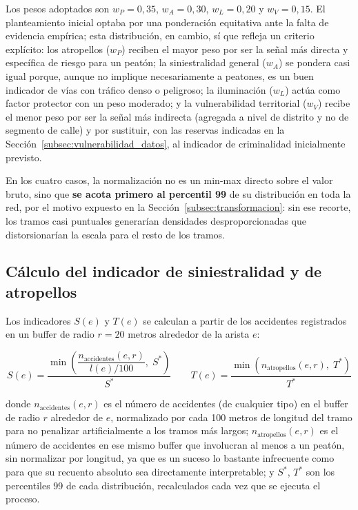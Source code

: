 Los pesos adoptados son $w_P = 0{,}35$, $w_A = 0{,}30$, $w_L = 0{,}20$ y $w_V = 0{,}15$. El planteamiento inicial optaba por una ponderación equitativa ante la falta de evidencia empírica; esta distribución, en cambio, sí que refleja un criterio explícito: los atropellos ($w_P$) reciben el mayor peso por ser la señal más directa y específica de riesgo para un peatón; la siniestralidad general ($w_A$) se pondera casi igual porque, aunque no implique necesariamente a peatones, es un buen indicador de vías con tráfico denso o peligroso; la iluminación ($w_L$) actúa como factor protector con un peso moderado; y la vulnerabilidad territorial ($w_V$) recibe el menor peso por ser la señal más indirecta (agregada a nivel de distrito y no de segmento de calle) y por sustituir, con las reservas indicadas en la Sección~\ref{subsec:vulnerabilidad_datos}, al indicador de criminalidad inicialmente previsto.

En los cuatro casos, la normalización no es un min-max directo sobre el valor bruto, sino que \textbf{se acota primero al percentil 99} de su distribución en toda la red, por el motivo expuesto en la Sección~\ref{subsec:transformacion}: sin ese recorte, los tramos casi puntuales generarían densidades desproporcionadas que distorsionarían la escala para el resto de los tramos.

\subsection{Cálculo del indicador de siniestralidad y de atropellos}
\label{subsec:indicador_accidentalidad}

Los indicadores $S(e)$ y $T(e)$ se calculan a partir de los accidentes registrados en un buffer de radio $r = 20$ metros alrededor de la arista $e$:

\begin{equation}
    S(e) = \frac{\min\left(\dfrac{n_{\text{accidentes}}(e, r)}{l(e) / 100},\; S^{*}\right)}{S^{*}}
    \qquad
    T(e) = \frac{\min\left(n_{\text{atropellos}}(e, r),\; T^{*}\right)}{T^{*}}
    \label{eq:accidentalidad}
\end{equation}

donde $n_{\text{accidentes}}(e, r)$ es el número de accidentes (de cualquier tipo) en el buffer de radio $r$ alrededor de $e$, normalizado por cada 100 metros de longitud del tramo para no penalizar artificialmente a los tramos más largos; $n_{\text{atropellos}}(e, r)$ es el número de accidentes en ese mismo buffer que involucran al menos a un peatón, sin normalizar por longitud, ya que es un suceso lo bastante infrecuente como para que su recuento absoluto sea directamente interpretable; y $S^{*}$, $T^{*}$ son los percentiles 99 de cada distribución, recalculados cada vez que se ejecuta el proceso.

